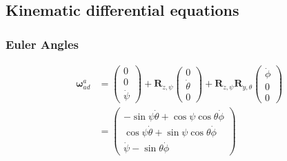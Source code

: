 \subsection{Kinematic differential equations}
\setcounter{subsubsection}{3}
\subsubsection{Euler Angles}

\begin{align*}
    \bm{\omega}_{ad}^a &= \begin{pmatrix}0 \\ 0 \\ \dot{\psi}\end{pmatrix} + 
        \bm{R}_{z,\psi}\begin{pmatrix} 0 \\ \dot{\theta} \\ 0\end{pmatrix} +
            \bm{R}_{z,\psi}\bm{R}_{y,\theta}\begin{pmatrix}\dot{\phi} \\ 0 \\ 0\end{pmatrix} \\
                &= \begin{pmatrix}
                    -\sin\psi\dot{\theta}+\cos\psi\cos\theta\dot{\phi} \\
                    \cos\psi\dot{\theta}+\sin\psi\cos\theta\dot{\phi} \\
                    \dot{\psi}-\sin\theta\dot{\phi}
                \end{pmatrix}
\end{align*}
